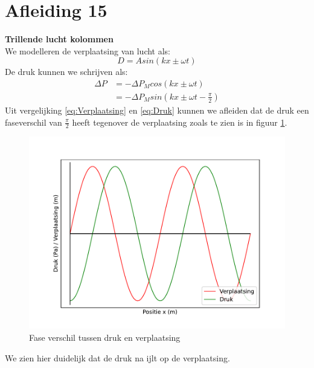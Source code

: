 \documentclass[a4paper,kul]{kulakarticle} %
\begin{document}
\section{Afleiding 15}
\textbf{Trillende lucht kolommen}\\
We modelleren de verplaatsing van lucht als:
\begin{equation}
	\label{eq:Verplaatsing}
	D = Asin(kx\pm\omega t)
\end{equation}
De druk kunnen we schrijven als:
\begin{align}
	\Delta P &= -\Delta P_M cos(kx\pm\omega t)\\
	\label{eq:Druk}
	&= -\Delta P_M sin(kx\pm\omega t-\frac{\pi}{2})
\end{align}
Uit vergelijking \ref{eq:Verplaatsing} en \ref{eq:Druk} kunnen we afleiden dat de druk een faseverschil van $\frac{\pi}{2}$ heeft tegenover de verplaatsing zoals te zien is in figuur \ref{fig:faseverschildrukverplaatsing}. 
\begin{figure}[h]
	\centering
	\includegraphics[width=0.7\linewidth]{FaseVerschilDrukVerplaatsing}
	\caption[Fase vershil druk verplaatsing]{Fase verschil tussen druk en verplaatsing}
	\label{fig:faseverschildrukverplaatsing}
\end{figure}
We zien hier duidelijk dat de druk na ijlt op de verplaatsing. 
\newpage
\end{document}
